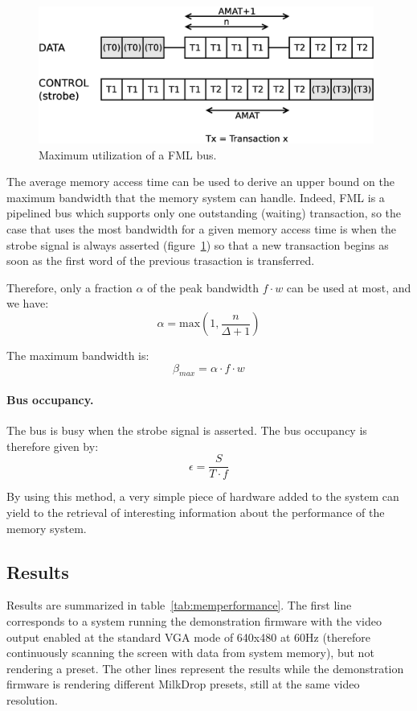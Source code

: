 \documentclass[a4paper,11pt]{kthesis}
\begin{document}
\begin{figure}
\centering
\includegraphics[height=45mm]{fmlmax.eps}
\caption{Maximum utilization of a FML bus.} \label{fig:fmlmax}
\end{figure}

The average memory access time can be used to derive an upper bound on the maximum bandwidth that the memory system can handle. Indeed, FML is a pipelined bus which supports only one outstanding (waiting) transaction, so the case that uses the most bandwidth for a given memory access time is when the strobe signal is always asserted (figure~\ref{fig:fmlmax}) so that a new transaction begins as soon as the first word of the previous trasaction is transferred.

Therefore, only a fraction $\alpha$ of the peak bandwidth $f \cdot w$ can be used at most, and we have:
\begin{equation}
\alpha = \textrm{max}(1, \frac{n}{\Delta+1})
\end{equation}

The maximum bandwidth is:
\begin{equation}
\beta_{max} = \alpha \cdot f \cdot w
\end{equation}

\paragraph{Bus occupancy.} The bus is busy when the strobe signal is asserted. The bus occupancy is therefore given by:
\begin{equation}
\epsilon = \frac{S}{T \cdot f}
\end{equation}

By using this method, a very simple piece of hardware added to the system can yield to the retrieval of interesting information about the performance of the memory system.

\subsection{Results}
Results are summarized in table~\ref{tab:memperformance}. The first line corresponds to a system running the demonstration firmware with the video output enabled at the standard VGA mode of 640x480 at 60Hz (therefore continuously scanning the screen with data from system memory), but not rendering a preset. The other lines represent the results while the demonstration firmware is rendering different MilkDrop presets, still at the same video resolution.
\end{document}
